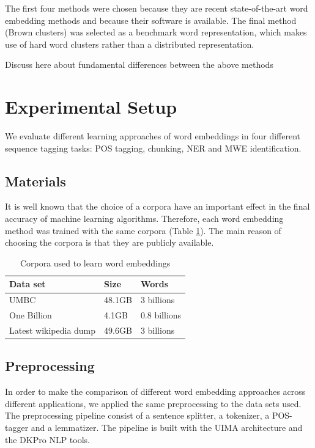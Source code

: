 \documentclass[11pt]{article}
\begin{document}
The first four methods were chosen because they are recent
state-of-the-art word embedding methods and because their software is
available. The final method (Brown clusters) was selected as a benchmark word representation, which makes use of hard word clusters rather than a distributed representation.

{\color{red}Discuss here about fundamental differences between the above methods}


\section{Experimental Setup}
We evaluate different learning approaches of word embeddings in four different sequence tagging tasks: POS tagging, chunking, NER and MWE identification.

\subsection{Materials}
It is well known that the choice of a corpora have an important effect in the final accuracy of machine learning algorithms. 
Therefore, each word embedding method was trained with the same corpora (Table \ref{corpus}). The main reason of choosing the corpora 
is that they are publicly available. 

\begin{table}[h]
\begin{center}
\begin{small}
\begin{tabular}{lll}
\hline
\textbf{Data set} & \textbf{Size} & \textbf{Words} \\ \hline
UMBC 	& 48.1GB & 3 billions \\
One Billion 	& 4.1GB & 0.8 billions  \\
Latest wikipedia dump & 49.6GB & 3 billions \\
\end{tabular}
\end{small}
\caption{Corpora used to learn word embeddings}
\label{corpus}
\end{center}
\end{table}

\subsection{Preprocessing}

In order to make the comparison of different word embedding approaches across different applications, we applied the same preprocessing to the data sets used. 
The preprocessing pipeline consist of a sentence splitter, a tokenizer, a POS-tagger and a lemmatizer. The pipeline is built with the UIMA architecture and the DKPro NLP tools. 
\end{document}

